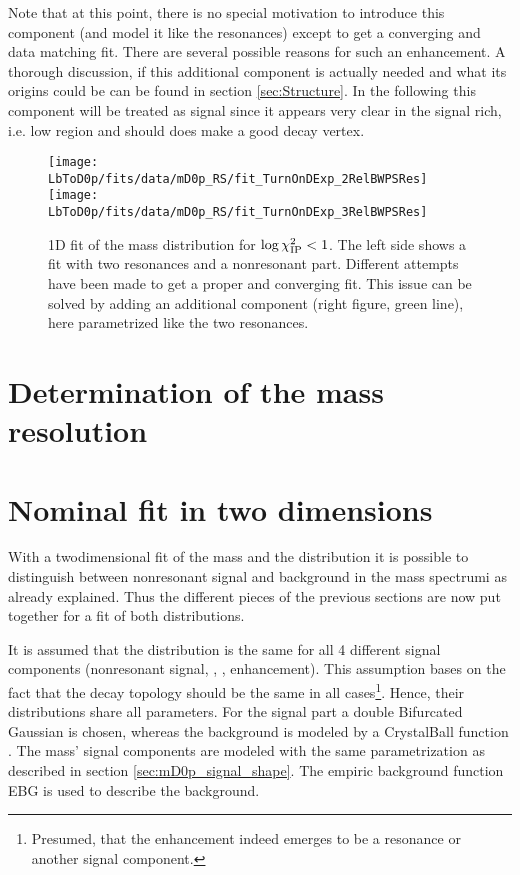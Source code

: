 Note that at this point, there is no special motivation to introduce this component (and model it like the resonances) except to get a converging and data matching fit.
There are several possible reasons for such an enhancement.
A thorough discussion, if this additional component is actually needed and what its origins could be can be found in section \ref{sec:Structure}.
In the following this component will be treated as signal since it appears very clear in the signal rich, i.e. low \logIP region and should does make a good decay vertex.
\begin{figure}[hptb]
    \centering
	\texttt{[image: LbToD0p/fits/data/mD0p\_RS/fit\_TurnOnDExp\_2RelBWPSRes]}
	\texttt{[image: LbToD0p/fits/data/mD0p\_RS/fit\_TurnOnDExp\_3RelBWPSRes]}
	\caption{1D fit of the \Dz\proton mass distribution for $\log \chi^2_{\text{IP}} < 1$. The left side shows a fit with two resonances and a nonresonant part. Different attempts have been made to get a proper and converging fit. This issue can be solved by adding an additional component (right figure, green line), here parametrized like the two resonances.}
    \label{fig:fit_mD0p_RS}
\end{figure}



\section{Determination of the mass resolution}
\label{sec:Massresolution}


\section{Nominal fit in two dimensions}
\label{sec:Fit_2D}
With a twodimensional fit of the \Dz\proton mass and the \logIP distribution it is possible to distinguish between nonresonant signal and background in the \Dz\proton mass spectrumi as already explained.
Thus the different pieces of the previous sections are now put together for a fit of both distributions.

It is assumed that the \logIP distribution is the same for all 4 different signal components (nonresonant signal, \LcResI, \LcResII, enhancement).
This assumption bases on the fact that the decay topology should be the same in all cases\footnote{Presumed, that the enhancement indeed emerges to be a resonance or another signal component.}.
Hence, their \logIP distributions share all parameters. For the \logIP signal part a double Bifurcated Gaussian \DBfG is chosen, whereas the background is modeled by a CrystalBall function \CB.
The \Dz\proton mass' signal components are modeled with the same parametrization as described in section \ref{sec:mD0p_signal_shape}. 
The empiric background function EBG is used to describe the background.

